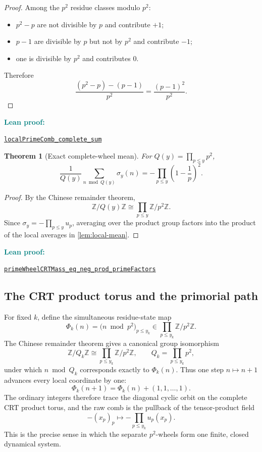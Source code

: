\documentclass[11pt]{article}
\newtheorem{theorem}{Theorem}[section]
\theoremstyle{definition}
\newcommand{\Z}{\mathbb Z}
\newcommand{\leanxref}[3]{%
  \par\smallskip
  {\small\noindent\textcolor{teal}{\textbf{#1:}}\par
  \noindent\href{#3}{\nolinkurl{#2}}\par}
  \smallskip
}
\begin{document}
\begin{proof}
Among the $p^2$ residue classes modulo $p^2$:
\begin{itemize}
\item $p^2-p$ are not divisible by $p$ and contribute $+1$;
\item $p-1$ are divisible by $p$ but not by $p^2$ and contribute $-1$;
\item one is divisible by $p^2$ and contributes $0$.
\end{itemize}
Therefore
\[
\frac{(p^2-p)-(p-1)}{p^2}
=\frac{(p-1)^2}{p^2}.
\]
\end{proof}
\leanxref{Lean proof}{localPrimeComb_complete_sum}{https://github.com/OVVO-Financial/prime-wheel-mobius/blob/main/formalization/RHLean/Analysis/PrimeWheelCompleteSpectrum.lean}

\begin{theorem}[Exact complete-wheel mean]\label{thm:complete-wheel}
For $Q(y)=\prod_{p\le y}p^2$,
\[
\frac1{Q(y)}\sum_{n\bmod Q(y)}\sigma_y(n)
=-\prod_{p\le y}\left(1-\frac1p\right)^2.
\]
\end{theorem}

\begin{proof}
By the Chinese remainder theorem,
\[
\Z/Q(y)\Z\cong\prod_{p\le y}\Z/p^2\Z.
\]
Since $\sigma_y=-\prod_{p\le y}u_p$, averaging over the product group factors into the product of the local averages in \cref{lem:local-mean}.
\end{proof}
\leanxref{Lean proof}{primeWheelCRTMass_eq_neg_prod_primeFactors}{https://github.com/OVVO-Financial/prime-wheel-mobius/blob/main/formalization/RHLean/Analysis/PrimeWheelCompleteSpectrum.lean}

\subsection{The CRT product torus and the primorial path}\label{subsec:crt-product-torus}

For fixed $k$, define the simultaneous residue-state map
\[
\Phi_k(n)=\bigl(n\bmod p^2\bigr)_{p\le y_k}
\in\prod_{p\le y_k}\Z/p^2\Z.
\]
The Chinese remainder theorem gives a canonical group isomorphism
\[
\Z/Q_k\Z\cong\prod_{p\le y_k}\Z/p^2\Z,
\qquad
Q_k=\prod_{p\le y_k}p^2,
\]
under which $n\bmod Q_k$ corresponds exactly to $\Phi_k(n)$.  Thus one step $n\mapsto n+1$ advances every local coordinate by one:
\[
\Phi_k(n+1)=\Phi_k(n)+(1,1,\ldots,1).
\]
The ordinary integers therefore trace the diagonal cyclic orbit on the complete CRT product torus, and the raw comb is the pullback of the tensor-product field
\[
-(x_p)_p\longmapsto-\prod_{p\le y_k}u_p(x_p).
\]
This is the precise sense in which the separate $p^2$-wheels form one finite, closed dynamical system.
\end{document}
